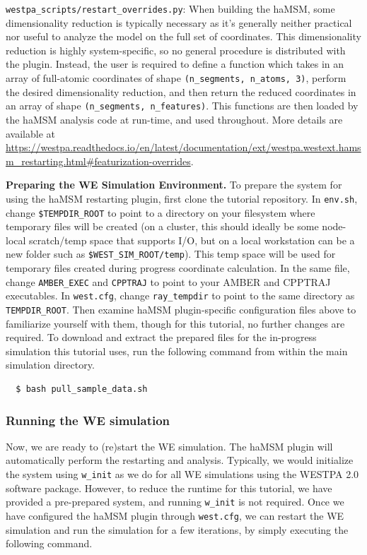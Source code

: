 \verb|westpa_scripts/restart_overrides.py|: When building the haMSM, some dimensionality reduction is typically necessary as it's generally neither practical nor useful to analyze the model on the full set of coordinates. 
This dimensionality reduction is highly system-specific, so no general procedure is distributed with the plugin. 
Instead, the user is required to define a function which takes in an array of full-atomic coordinates of shape \verb|(n_segments, n_atoms, 3)|, perform the desired dimensionality reduction, and then return the reduced coordinates in an array of shape \verb|(n_segments, n_features)|. 
This functions are then loaded by the haMSM analysis code at run-time, and used throughout. 
More details are available at {\url{https://westpa.readthedocs.io/en/latest/documentation/ext/westpa.westext.hamsm_restarting.html#featurization-overrides}}.

\textbf{Preparing the WE Simulation Environment.} To prepare the system for using the haMSM restarting plugin, first clone the tutorial repository. 
In \verb|env.sh|, change \verb|$TEMPDIR_ROOT| to point to a directory on your filesystem where temporary files will be created (on a cluster, this should ideally be some node-local scratch/temp space that supports I/O, but on a local workstation can be a new folder such as \verb|$WEST_SIM_ROOT/temp|). 
This temp space will be used for temporary files created during progress coordinate calculation. 
In the same file, change \verb|AMBER_EXEC| and \verb|CPPTRAJ| to point to your AMBER and CPPTRAJ executables. 
In \verb|west.cfg|, change \verb|ray_tempdir| to point to the same directory as \verb|TEMPDIR_ROOT|. 
Then examine haMSM plugin-specific configuration files above to familiarize yourself with them, though for this tutorial, no further changes are required. 
To download and extract the prepared files for the in-progress simulation this tutorial uses, run the following command from within the main simulation directory.

\begin{verbatim}
  $ bash pull_sample_data.sh
\end{verbatim}

\subsubsection{Running the WE simulation}
Now, we are ready to (re)start the WE simulation. 
The haMSM plugin will automatically perform the restarting and analysis. Typically, we would initialize the system using \verb|w_init| as we do for all WE simulations using the WESTPA 2.0 software package. 
However, to reduce the runtime for this tutorial, we have provided a pre-prepared system, and running \verb|w_init| is not required. 
Once we have configured the haMSM plugin through \verb|west.cfg|, we can restart the WE simulation and run the simulation for a few iterations, by simply executing the following command.

